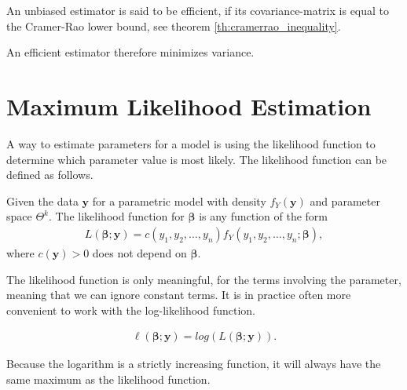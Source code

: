 \begin{definition} 
\label{def:efficient_estimator}
An unbiased estimator is said to be efficient, if its covariance-matrix is equal to the Cramer-Rao lower bound, see theorem \ref{th:cramerrao_inequality}.
\end{definition}

An efficient estimator therefore minimizes variance. 
 
\section{Maximum Likelihood Estimation}

A way to estimate parameters for a model is using the likelihood function to determine which parameter value is most likely. The likelihood function can be defined as follows.

\begin{definition} 
\label{def:likelihood_function}
Given the data $\textbf{y}$ for a parametric model with density $f_Y(\textbf{y})$ and parameter space $\Theta^k$. The likelihood function for $\boldsymbol{\beta}$ is any function of the form 
\begin{align*}
    L(\boldsymbol{\beta}; \textbf{y}) = c(y_1, y_2, \ldots, y_n)f_Y(y_1, y_2, \ldots, y_n; \boldsymbol{\beta}), 
\end{align*}
where $c(\textbf{y})>0$ does not depend on $\boldsymbol{\beta}$. 
\end{definition}

The likelihood function is only meaningful, for the terms involving the parameter, meaning that we can ignore constant terms. It is in practice often more convenient to work with the log-likelihood function. 

\begin{align*}
    \ell(\boldsymbol{\beta};\textbf{y})=log(L(\boldsymbol{\beta}; \textbf{y})).
\end{align*}

Because the logarithm is a strictly increasing function, it will always have the same maximum as the likelihood function. 

